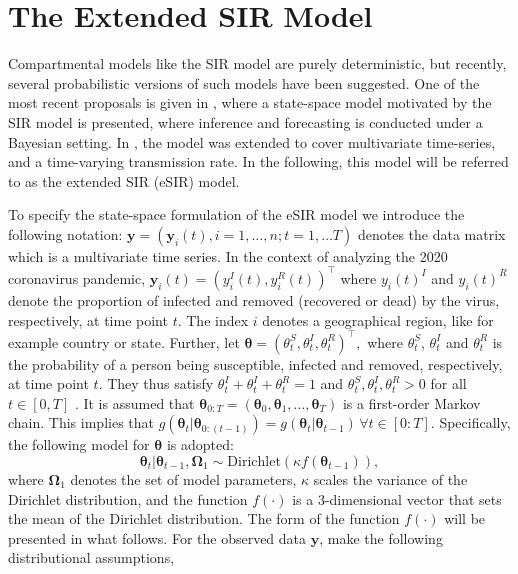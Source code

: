 \documentclass[10pt,a4paper]{article}
\begin{document}
\section{The Extended SIR Model}
Compartmental models like the SIR model are purely deterministic, but recently, several probabilistic versions of such models have been suggested. One of the most recent proposals is given in \cite{osthus2017forecasting}, where a state-space model motivated by the SIR model is presented, where inference and forecasting is conducted under a Bayesian setting. In \cite{song2020epidemiological}, the model was extended to cover multivariate time-series, and a time-varying transmission rate. In the following, this model will be referred to as the extended SIR (eSIR) model. 

To specify the state-space formulation of the eSIR model we introduce the following notation: 
%
$
\mathbf{y} = (\mathbf{y}_{i}(t), i = 1, \ldots, n; t = 1, \ldots T) 
$
%
denotes the data matrix which is a multivariate time series. In the context of analyzing the 2020 coronavirus pandemic, 
%
$
\mathbf{y}_{i}(t) = (y_{i}^I(t), y_{i}^R(t))^\top
$
%
where $y_{i}(t)^I$ and $y_{i}(t)^R$ denote the proportion of infected and removed (recovered or dead) by the virus, respectively, at time point $t$. The index $i$ denotes a geographical region, like for example country or state. Further, let  
%
$
\boldsymbol{\theta} = (\theta_t^S, \theta_t^I, \theta_t^R)^\top,
$
%
where $\theta_t^S$, $\theta_t^I$ and $\theta_t^R$ is the probability of a person being susceptible, infected and removed, respectively, at time point $t$. They thus satisfy 
%
$
\theta_t^I + \theta_t^I + \theta_t^R = 1
$
% 
and 
%
$
\theta_t^S, \theta_t^I, \theta_t^R > 0
$
%
for all $t \in [0, T]$ \parencite{osthus2017forecasting}. It is assumed that 
%
$
\boldsymbol{\theta}_{0:T} = (\boldsymbol{\theta}_0, \boldsymbol{\theta}_1, \ldots, \boldsymbol{\theta}_T)
$
%
is a first-order Markov chain. This implies that 
%
$
g(\boldsymbol{\theta}_t|\boldsymbol{\theta}_{0:(t-1)}) = g(\boldsymbol{\theta}_t|\boldsymbol{\theta}_{t-1}) \, \forall t \in [0:T]. 
$
%
Specifically, the following model for $\boldsymbol{\theta}$ is adopted:
%
$$
\boldsymbol{\theta}_t | \boldsymbol{\theta}_{t-1}, \boldsymbol{\Omega}_1 \sim \text{Dirichlet}(\kappa f(\boldsymbol{\theta}_{t-1})),
$$
%
where $\boldsymbol{\Omega}_1$ denotes the set of model parameters, $\kappa$ scales the variance of the Dirichlet distribution, and the function $f(\cdot)$ is a 3-dimensional vector that sets the mean of the Dirichlet distribution. The form of the function $f(\cdot)$ will be presented in what follows. For the observed data $\mathbf{y}$, \cite{song2020epidemiological} make the following distributional assumptions,  
\end{document}
